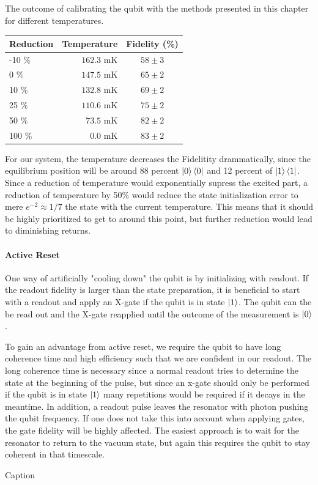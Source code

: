\begin{margintable}
\centering
\caption{The outcome of calibrating the qubit with the methods presented in this chapter for different temperatures.}
\vspace{0.3 cm}
\begin{tabular}{lr|c}
\hline
\textbf{Reduction}        & Temperature                  & Fidelity (\%)\\ \hline
-10 \%                    &  $162.3 $ mK       &  $58 \pm 3$\\
0   \%                    &  $147.5 $ mK       &  $65 \pm 2$\\
10  \%                    &  $132.8 $ mK       &  $69 \pm 2$\\
25  \%                    &  $110.6 $ mK       &  $75 \pm 2$\\
50  \%                    &  $\; 73.5$  mK     &  $82 \pm 2$\\
100 \%                    &  $\;\; 0.0$  mK    &  $83 \pm 2$\\
\end{tabular}
\label{tab:temperature_contribution_estimation}
\end{margintable}
For our system, the temperature decreases the Fidelitity drammatically, since the equilibrium position will be around 88 percent $\ket{0}\bra{0}$ and 12 percent of $\ket{1}\bra{1}$. Since a reduction of temperature would exponentially supress the excited part, a reduction of temperature by 50\% would reduce the state initialization error to mere $e^{-2}\approx 1/7$ the state with the current temperature. This means that it should be highly prioritized to get to around this point, but further reduction  would lead to diminishing returns.

\paragraph{Active Reset} One way of artificially "cooling down" the qubit is by initializing with readout. If the readout fidelity is larger than the state preparation, it is beneficial to start with a readout and apply an X-gate if the qubit is in state $\ket{1}$. The qubit can the be read out and the X-gate reapplied until the outcome of the measurement is $\ket{0}$.

To gain an advantage from active reset, we require the qubit to have long coherence time and high efficiency such that we are confident in our readout. The long coherence time is necessary since a normal readout tries to determine the state at the beginning of the pulse, but since an x-gate should only be performed if the qubit is in state $\ket{1}$ many repetitions would be required if it decays in the meantime. In addition, a readout pulse leaves the resonator with photon pushing the qubit frequency. If one does not take this into account when applying gates, the gate fidelity will be highly affected. The easiest approach is to wait for the resonator to return to the vacuum state, but again this requires the qubit to stay coherent in that timescale.  
\begin{marginfigure}
    \centering
    \caption{Caption}
    \label{fig:enter-label}
\end{marginfigure}


